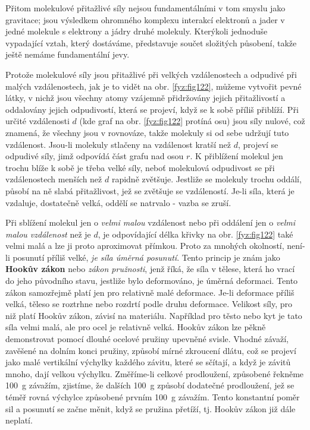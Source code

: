 {    Přitom molekulové přitažlivé síly nejsou fundamentálními v tom smyslu jako gravitace; jsou 
    výsledkem ohromného komplexu interakcí elektronů a jader v jedné molekule s elektrony a jádry 
    druhé molekuly. Kterýkoli jednoduše vypadající vztah, který dostáváme, představuje součet 
    složitých působení, takže ještě nemáme fundamentální jevy.
    
    Protože molekulové síly jsou přitažlivé při velkých vzdálenostech a odpudivé při malých 
    vzdálenostech, jak je to vidět na obr. \ref{fyz:fig122}, můžeme vytvořit pevné látky, v nichž 
    jsou všechny atomy vzájemně přidržovány jejich přitažlivostí a oddalovány jejich odpudivostí, 
    která se projeví, když se k sobě příliš přiblíží. Při určité vzdálenosti \(d\) (kde graf na 
    obr. \ref{fyz:fig122} protíná osu) jsou síly nulové, což znamená, že všechny jsou v rovnováze, 
    takže molekuly si od sebe udržují tuto vzdálenost. Jsou-li molekuly stlačeny na vzdálenost 
    kratší než \(d\), projeví se odpudivé síly, jimž odpovídá část grafu nad osou \(r\). K 
    přiblížení molekul jen trochu blíže k sobě je třeba velké síly, neboť molekulová odpudivost se 
    při vzdálenostech menších než \(d\) rapidně zvětšuje. Jestliže se molekuly trochu oddálí, 
    působí na ně slabá přitažlivost, jež se zvětšuje se vzdáleností. Je-li síla, která je vzdaluje, 
    dostatečně velká, oddělí se natrvalo - vazba se zruší.
    
    Při sblížení molekul jen o \emph{velmi malou} vzdálenost nebo při oddálení jen o \emph{velmi 
    malou vzdálenost} než je \(d\), je odpovídající délka křivky na obr. \ref{fyz:fig122} také 
    velmi malá a lze ji proto aproximovat přímkou. Proto za mnohých okolností, není-li posunutí 
    příliš velké, \emph{je síla úměrná posunutí}. Tento princip je znám jako \textbf{Hookův zákon} 
    nebo \emph{zákon pružnosti}, jenž říká, že síla v tělese, která ho vrací do jeho původního 
    stavu, jestliže bylo deformováno, je úměrná deformaci. Tento zákon samozřejmě platí jen pro 
    relativně malé deformace. Je-li deformace příliš velká, těleso se roztrhne nebo rozdrtí podle 
    druhu deformace. Velikost síly, pro niž platí Hookův zákon, závisí na materiálu. Například pro 
    těsto nebo kyt je tato síla velmi malá, ale pro ocel je relativně velká. Hookův zákon lze pěkně 
    demonstrovat pomocí dlouhé ocelové pružiny upevněné svisle. Vhodné závaží, zavěšené na dolním 
    konci pružiny, způsobí mírné zkroucení dlátu, což se projeví jako malé vertikální výchylky 
    každého závitu, které se sčítají, a když je závitů mnoho, dají velkou výchylku. Změříme-li 
    celkové prodloužení, způsobené řekněme \SI{100}{\g} závažím, zjistíme, že dalších \SI{100}{\g} 
    způsobí dodatečné prodloužení, jež se téměř rovná výchylce způsobené prvním \SI{100}{\g} 
    závažím. Tento konstantní poměr sil a posunutí se začne měnit, když se pružina přetíží, tj. 
    Hookův zákon již dále neplatí.
    
}
